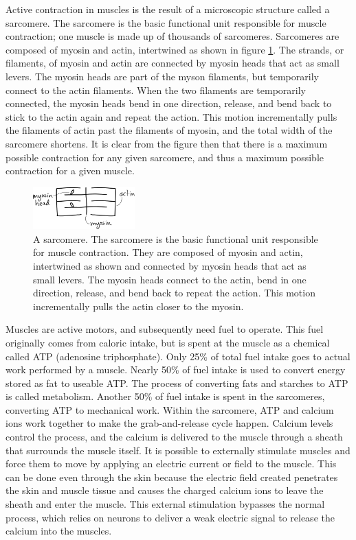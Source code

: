 Active contraction in muscles is the result of a microscopic structure called a sarcomere. The sarcomere is the basic functional unit responsible for muscle contraction; one muscle is made up of thousands of sarcomeres. Sarcomeres are composed of myosin and actin, intertwined as shown in figure \ref{fig:Sarcomere}. The strands, or filaments, of myosin and actin are connected by myosin heads that act as small levers. The myosin heads are part of the myson filaments, but temporarily connect to the actin filaments. When the two filaments are temporarily connected, the myosin heads bend in one direction, release, and bend back to stick to the actin again and repeat the action. This motion incrementally pulls the filaments of actin past the filaments of myosin, and the total width of the sarcomere shortens. It is clear from the figure then that there is a maximum possible contraction for any given sarcomere, and thus a maximum possible contraction for a given muscle. 

\begin{figure}[htb]		%
\begin{centering}
\includegraphics[width=0.35\textwidth]{Figures/Sarcomere}\par
\end{centering}
\caption[Diagram: A Sarcomere]{A sarcomere. The sarcomere is the basic functional unit responsible for muscle contraction. They are composed of myosin and actin, intertwined as shown and connected by myosin heads that act as small levers. The myosin heads connect to the actin, bend in one direction, release, and bend back to repeat the action. This motion incrementally pulls the actin closer to the myosin.}
\label{fig:Sarcomere}
\end{figure}
%

Muscles are active motors, and subsequently need fuel to operate. This fuel originally comes from caloric intake, but is spent at the muscle as a chemical called ATP (adenosine triphosphate). Only 25\% of total fuel intake goes to actual work performed by a muscle. Nearly 50\% of fuel intake is used to convert energy stored as fat to useable ATP. The process of converting fats and starches to ATP is called metabolism. Another 50\% of fuel intake is spent in the sarcomeres, converting ATP to mechanical work. Within the sarcomere, ATP and calcium ions work together to make the grab-and-release cycle happen. Calcium levels control the process, and the calcium is delivered to the muscle through a sheath that surrounds the muscle itself. It is possible to externally stimulate muscles and force them to move by applying an electric current or field to the muscle. This can be done even through the skin because the electric field created penetrates the skin and muscle tissue and causes the charged calcium ions to leave the sheath and enter the muscle. This external stimulation bypasses the normal process, which relies on neurons to deliver a weak electric signal to release the calcium into the muscles. 


